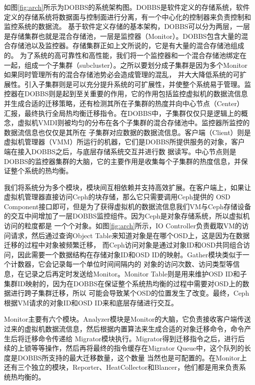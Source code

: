 如图\ref{fig:arch}所示为DOBBS的系统架构图。DOBBS是软件定义的存储系统，软件定义的存储系统将数据面与控制面进行分离，有一个中心化的控制器来负责控制和监控系统的数据流\cite{thereska2013ioflow}。
基于软件定义存储的基本架构，DOBBS可以分为两层，一层是存储集群也就是混合存储池，一层是监控器（Monitor）。DOBBS包含大量的混合存储池以及监控器。存储集群正如上文所说的，它是有大量的混合存储池组成的。
为了系统的高可靠性和高性能，我们将一个监控器和一个混合存储池绑定在一起，组成一个子集群（subcluster）。之所以要划分成子集群是因为多个Monitor如果同时管理所有的混合存储池势必会造成管理的混乱，
并大大降低系统的可扩展性。引入子集群则是可以充分提升系统的可扩展性，并使整个系统易于管理。监控器在DOBBS则是起到至关重要的作用，它的作用包括监控虚拟机的数据流信息并生成合适的迁移策略，还有检测其所在子集群的热度并向中心节点（Center）
汇报，最终执行全局热均衡迁移指令。在DOBBS中，子集群仅仅只是逻辑上的概念，虚拟机VMDI则被均匀的分布在各个子集群的混合存储池中。监控器所监控的数据流信息也仅仅是其所在
子集群对应数据的数据流信息。客户端（Client）则是虚拟机管理器（VMM）所运行的机器，它们是DOBBS所提供服务的对象，客户端在接入DOBBS之后，与底层存储系统交互并进行数
据读写。中心节点则是DOBBS的监控器集群的大脑，它的主要作用是收集每个子集群的热度信息，并保证整个系统的热均衡。

我们将系统分为多个模块，模块间互相依赖并支持高效扩展。在客户端上，如果让虚拟机管理器直接访问Ceph的块存储，那么它只需要调用Ceph提供的
OSD Component接口即可，但是为了获得虚拟机的数据流信息我们VM与Ceph存储设备的交互中间增加了一层DOBBS监控组件。因为Ceph是对象存储系统，所以虚拟机访问的粒度都是
一个个对象。如图\ref{fig:arch}所示，IO Controller负责截取VM的访问请求，然后通过查询Object Table来知道对象是在哪个OSD上，这是因为在数据迁移的过程中对象被频繁迁移，
而Ceph访问对象是通过对象ID和OSD共同组合访问，因此需要一个数据结构在存储对象ID和OSD ID的映射。Gather模块类似于一个计数器，它会记录每一个单位时间间隔内的
对象的访问次数、访问类型等信息，在记录之后再定时发送给Monitor。Monitor Table则是用来维护OSD ID和子集群ID映射的，因为在DOBBS在保证整个系统热均衡的过程中需要对OSD上的数据进行跨子集群迁移，所以
可能会导致某个OSD的位置发生了改变。最终，Ceph根据VM请求的对象ID和OSD ID来和底层存储进行交互。

Monitor主要有六个模块。Analyzer模块是Monitor的大脑，它负责接收客户端传送过来的虚拟机数据流信息，然后根据内置算法来生成合适的对象迁移命令，命令产生后将迁移命令传递给
Migrator模块执行。Migrator得到迁移指令之后，进行后续的上锁等等操作，然后再将最终的指令缓存在Migrator Queue中，这个队列的长度是DOBBS所支持的最大迁移数量，这个数量
当然也是可配置的。在Monitor上还有三个独立的模块，Reporter、HeatCollector和Blancer，他们都是用来负责系统热均衡的。

